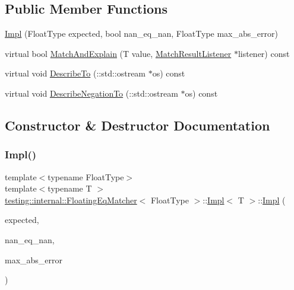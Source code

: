 \subsection*{Public Member Functions}
\begin{DoxyCompactItemize}
\item 
\hyperlink{classtesting_1_1internal_1_1_floating_eq_matcher_1_1_impl_a314057e171f872ad478b3e143121aecd}{Impl} (Float\+Type expected, bool nan\+\_\+eq\+\_\+nan, Float\+Type max\+\_\+abs\+\_\+error)
\item 
virtual bool \hyperlink{classtesting_1_1internal_1_1_floating_eq_matcher_1_1_impl_a4ce47c481fdc4973ed671a492f455f99}{Match\+And\+Explain} (T value, \hyperlink{classtesting_1_1_match_result_listener}{Match\+Result\+Listener} $\ast$listener) const
\item 
virtual void \hyperlink{classtesting_1_1internal_1_1_floating_eq_matcher_1_1_impl_aab6dbbe39ef8337e4686ae0f8c81a2c3}{Describe\+To} (\+::std\+::ostream $\ast$os) const
\item 
virtual void \hyperlink{classtesting_1_1internal_1_1_floating_eq_matcher_1_1_impl_a3eff238a812f4a105df1222a28f6cdbf}{Describe\+Negation\+To} (\+::std\+::ostream $\ast$os) const
\end{DoxyCompactItemize}


\subsection{Constructor \& Destructor Documentation}
\mbox{\label{classtesting_1_1internal_1_1_floating_eq_matcher_1_1_impl_a314057e171f872ad478b3e143121aecd}} 
\subsubsection{\texorpdfstring{Impl()}{Impl()}}
{\footnotesize\ttfamily template$<$typename Float\+Type$>$ \\
template$<$typename T $>$ \\
\hyperlink{classtesting_1_1internal_1_1_floating_eq_matcher}{testing\+::internal\+::\+Floating\+Eq\+Matcher}$<$ Float\+Type $>$\+::\hyperlink{classtesting_1_1internal_1_1_floating_eq_matcher_1_1_impl}{Impl}$<$ T $>$\+::\hyperlink{classtesting_1_1internal_1_1_floating_eq_matcher_1_1_impl}{Impl} (\begin{DoxyParamCaption}\item[{Float\+Type}]{expected,  }\item[{bool}]{nan\+\_\+eq\+\_\+nan,  }\item[{Float\+Type}]{max\+\_\+abs\+\_\+error }\end{DoxyParamCaption})\hspace{0.3cm}{\ttfamily [inline]}}



